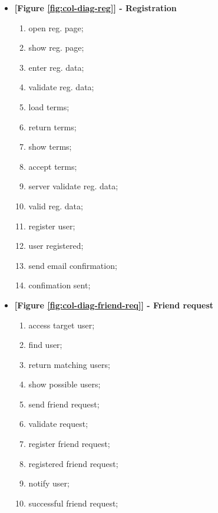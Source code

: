 \documentclass{article}
\begin{document}
			\begin{itemize}
				\item \textbf{[Figure \ref{fig:col-diag-reg}] - Registration}
				\begin{enumerate}
					\item open reg. page;
					\item show reg. page;
					\item enter reg. data;
					\item validate reg. data;
					\item load terms;
					\item return terms;
					\item show terms;
					\item accept terms;
					\item server validate reg. data;
					\item valid reg. data;
					\item register user;
					\item user registered;
					\item send email confirmation;
					\item confimation sent;
				\end{enumerate}

				\item \textbf{[Figure \ref{fig:col-diag-friend-req}] - Friend request}
				\begin{enumerate}
					\item access target user;
					\item find user;
					\item return matching users;
					\item show possible users;
					\item send friend request;
					\item validate request;
					\item register friend request;
					\item registered friend request;
					\item notify user;
					\item successful friend request;
				\end{enumerate}


\end{itemize}
\end{document}
